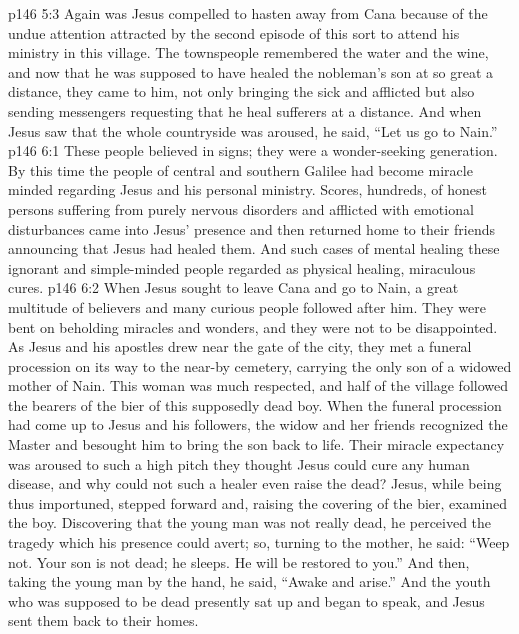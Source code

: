 \vs p146 5:3 Again was Jesus compelled to hasten away from Cana because of the undue attention attracted by the second episode of this sort to attend his ministry in this village. The townspeople remembered the water and the wine, and now that he was supposed to have healed the nobleman’s son at so great a distance, they came to him, not only bringing the sick and afflicted but also sending messengers requesting that he heal sufferers at a distance. And when Jesus saw that the whole countryside was aroused, he said, \textcolor{ubdarkred}{“Let us go to Nain.”}
\vs p146 6:1 These people believed in signs; they were a wonder\hyp{}seeking generation. By this time the people of central and southern Galilee had become miracle minded regarding Jesus and his personal ministry. Scores, hundreds, of honest persons suffering from purely nervous disorders and afflicted with emotional disturbances came into Jesus’ presence and then returned home to their friends announcing that Jesus had healed them. And such cases of mental healing these ignorant and simple\hyp{}minded people regarded as physical healing, miraculous cures.
\vs p146 6:2 \pc When Jesus sought to leave Cana and go to Nain, a great multitude of believers and many curious people followed after him. They were bent on beholding miracles and wonders, and they were not to be disappointed. As Jesus and his apostles drew near the gate of the city, they met a funeral procession on its way to the near\hyp{}by cemetery, carrying the only son of a widowed mother of Nain. This woman was much respected, and half of the village followed the bearers of the bier of this supposedly dead boy. When the funeral procession had come up to Jesus and his followers, the widow and her friends recognized the Master and besought him to bring the son back to life. Their miracle expectancy was aroused to such a high pitch they thought Jesus could cure any human disease, and why could not such a healer even raise the dead? Jesus, while being thus importuned, stepped forward and, raising the covering of the bier, examined the boy. Discovering that the young man was not really dead, he perceived the tragedy which his presence could avert; so, turning to the mother, he said: \textcolor{ubdarkred}{“Weep not. Your son is not dead; he sleeps. He will be restored to you.”} And then, taking the young man by the hand, he said, \textcolor{ubdarkred}{“Awake and arise.”} And the youth who was supposed to be dead presently sat up and began to speak, and Jesus sent them back to their homes.
